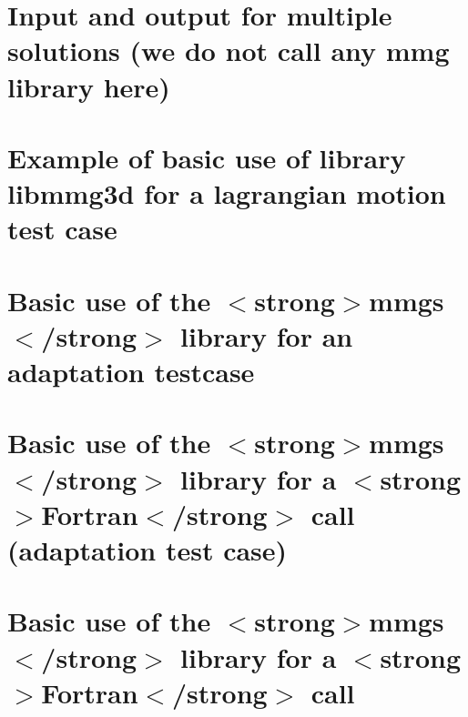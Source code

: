 \documentclass[twoside]{book}
\newcommand{\+}{\discretionary{\mbox{\scriptsize$\hookleftarrow$}}{}{}}
\begin{document}
\chapter{Input and output for multiple solutions (we do not call any mmg library here)}
\label{md_libexamples_mmg3d_io_multisols_example6_README}

\chapter{Example of basic use of library libmmg3d for a lagrangian motion test case}
\label{md_libexamples_mmg3d_LagrangianMotion_example0_README}

\chapter{Basic use of the \texorpdfstring{$<$}{<}strong\texorpdfstring{$>$}{>}mmgs\texorpdfstring{$<$}{<}/strong\texorpdfstring{$>$}{>} library for an adaptation testcase}
\label{md_libexamples_mmgs_adaptation_example0_README}

\chapter{Basic use of the \texorpdfstring{$<$}{<}strong\texorpdfstring{$>$}{>}mmgs\texorpdfstring{$<$}{<}/strong\texorpdfstring{$>$}{>} library for a \texorpdfstring{$<$}{<}strong\texorpdfstring{$>$}{>}Fortran\texorpdfstring{$<$}{<}/strong\texorpdfstring{$>$}{>} call (adaptation test case)}
\label{md_libexamples_mmgs_adaptation_example0_fortran_example0_a_README}

\chapter{Basic use of the \texorpdfstring{$<$}{<}strong\texorpdfstring{$>$}{>}mmgs\texorpdfstring{$<$}{<}/strong\texorpdfstring{$>$}{>} library for a \texorpdfstring{$<$}{<}strong\texorpdfstring{$>$}{>}Fortran\texorpdfstring{$<$}{<}/strong\texorpdfstring{$>$}{>} call}
\label{md_libexamples_mmgs_adaptation_example0_fortran_README}

\end{document}
